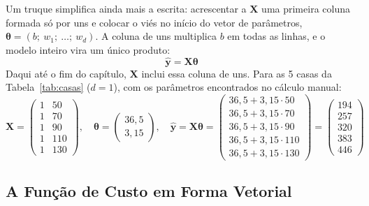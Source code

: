 \documentclass[a4paper,12pt,openany]{book}
\begin{document}
Um truque simplifica ainda mais a escrita: acrescentar a \(\mathbf{X}\) uma primeira coluna formada só por uns e colocar o viés no início do vetor de parâmetros, \(\boldsymbol{\theta} = (b;\ w_1;\ \dots;\ w_d)\). A coluna de uns multiplica \(b\) em todas as linhas, e o modelo inteiro vira um único produto:
\begin{equation}\label{eq:modelo_matricial}
\hat{\mathbf{y}} = \mathbf{X}\boldsymbol{\theta}
\end{equation}
Daqui até o fim do capítulo, \(\mathbf{X}\) inclui essa coluna de uns. Para as 5 casas da Tabela~\ref{tab:casas} (\(d = 1\)), com os parâmetros encontrados no cálculo manual:
\[
\mathbf{X} = \begin{pmatrix} 1 & 50 \\ 1 & 70 \\ 1 & 90 \\ 1 & 110 \\ 1 & 130 \end{pmatrix},
\quad
\boldsymbol{\theta} = \begin{pmatrix} 36,5 \\ 3,15 \end{pmatrix},
\quad
\hat{\mathbf{y}} = \mathbf{X}\boldsymbol{\theta} = \begin{pmatrix} 36,5 + 3,15 \cdot 50 \\ 36,5 + 3,15 \cdot 70 \\ 36,5 + 3,15 \cdot 90 \\ 36,5 + 3,15 \cdot 110 \\ 36,5 + 3,15 \cdot 130 \end{pmatrix}
= \begin{pmatrix} 194 \\ 257 \\ 320 \\ 383 \\ 446 \end{pmatrix}
\]

\subsection{A Função de Custo em Forma Vetorial}
\end{document}
